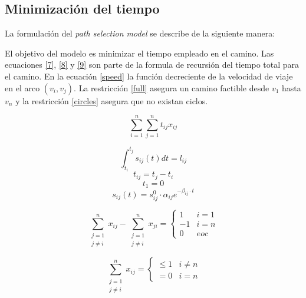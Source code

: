 \documentclass[letter, 10pt]{article}
\begin{document}
\subsection{Minimización del tiempo} 

La formulación del \textit{path selection model} se describe de la siguiente manera:

El objetivo del modelo es minimizar el tiempo empleado en el camino. Las ecuaciones \eqref{7}, \eqref{8} y \eqref{9} son parte de la formula de recursión del tiempo total para el camino. En la ecuación \eqref{speed} la función decreciente de la velocidad de viaje en el arco $(v_i,v_j)$. La restricción \eqref{full} asegura un camino factible desde $v_1$ hasta $v_n$ y la restricción \eqref{circles} asegura que no existan ciclos.

\begin{equation}
	 \sum_{i=1}^{n}\sum_{j=1}^{n} t_{ij}x_{ij}
\end{equation}

\begin{equation}\label{7}
  \int_{t_i}^{t_j} s_{ij}(t)dt = l_{ij}
\end{equation}
\begin{equation}\label{8}
  t_{ij} = t_j - t_i
\end{equation}
\begin{equation}\label{9}
t_1 =0
\end{equation}
\begin{equation}\label{speed}
  s_{ij}(t) = s_{ij}^0 \cdot \alpha_{ij} e^{-\beta_{ij}\cdot t}
\end{equation}

\begin{equation}\label{full}
	\sum_{\substack{j=1\\
                  j \neq i}}^n x_{ij} - \sum_{\substack{j=1\\
                  j \neq i}}^{n} x_{ji} = \begin{cases}
1 & i=1\\
-1 & i=n \\
0 & eoc
\end{cases}
\end{equation}



\begin{equation}\label{circles}
	\sum_{\substack{j=1\\
                  j \neq i}}^n x_{ij} = \begin{cases}
\leq 1 & i\neq n\\
=0 & i=n 
\end{cases}
\end{equation}
\end{document}
